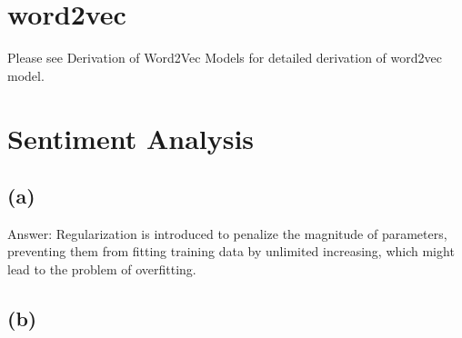 \documentclass {article}
\begin{document}
	\section{word2vec}
	Please see Derivation of Word2Vec Models for detailed derivation of word2vec model.
	\section{Sentiment Analysis}
	\subsection*{(a)}
	Answer:	Regularization is introduced to penalize the magnitude of parameters, preventing them from fitting training data by unlimited increasing, which might lead to the problem of overfitting. 
	\subsection*{(b)}
	
\end{document}
